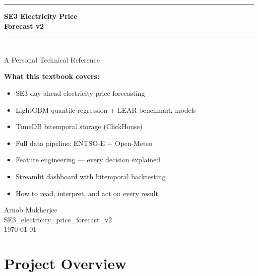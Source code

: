 \documentclass[12pt, a4paper, oneside]{memoir}
\begin{document}

\begin{titlingpage}
  \vspace*{3cm}
  {\color{se3blue}\rule{\linewidth}{2pt}}
  \vspace{0.5cm}

  {\fontsize{28}{34}\selectfont\sffamily\bfseries SE3 Electricity Price}\\[0.3cm]
  {\fontsize{28}{34}\selectfont\sffamily\bfseries Forecast v2}\\[0.3cm]
  {\color{se3blue}\rule{\linewidth}{0.8pt}}\\[0.5cm]
  {\Large\sffamily A Personal Technical Reference}\\[2cm]

\begin{tcolorbox}[enhanced, colback=se3lightblue, colframe=se3blue,
    arc=8pt, boxrule=1pt, left=12pt, right=12pt, top=8pt, bottom=8pt]
\sffamily\small
\textbf{What this textbook covers:}
\begin{itemize}[noitemsep]
  \item SE3 day-ahead electricity price forecasting
  \item LightGBM quantile regression + LEAR benchmark models
  \item TimeDB bitemporal storage (ClickHouse)
  \item Full data pipeline: ENTSO-E + Open-Meteo
  \item Feature engineering --- every decision explained
  \item Streamlit dashboard with bitemporal backtesting
  \item How to read, interpret, and act on every result
\end{itemize}
\end{tcolorbox}

  \vfill
  {\large\sffamily Arnob Mukherjee}\\[0.2cm]
  {\sffamily\color{se3gray} SE3\_electricity\_price\_forecast\_v2}\\[0.2cm]
  {\sffamily\color{se3gray} \today}
\end{titlingpage}

\tableofcontents*
\clearpage

\chapter{Project Overview}
\end{document}
